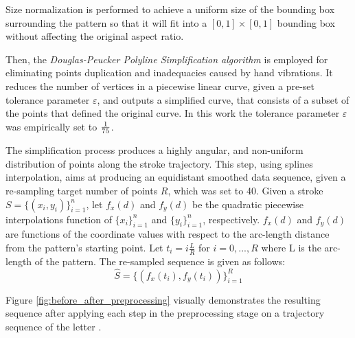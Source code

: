 \documentclass[10pt, conference, compsocconf]{IEEEtran}
\begin{document}
Size normalization is performed to achieve a uniform size of the bounding box surrounding the pattern so that it will fit into a $[0,1]\times[0,1]$ bounding box without affecting the original aspect ratio. 

Then, the \emph{Douglas-Peucker Polyline Simplification algorithm} \cite{douglas1973algorithms} is employed for eliminating points duplication and inadequacies caused by hand vibrations. 
It reduces the number of vertices in a piecewise linear curve, given a pre-set tolerance parameter $\varepsilon$, and outputs a simplified curve, that consists of a subset of the points that defined the original curve.
In this work the tolerance parameter $\varepsilon$ was empirically set to ${1 \over 75}$.

The simplification process produces a highly angular, and non-uniform distribution of points along the stroke trajectory.
This step, using splines interpolation, aims at producing an equidistant smoothed data sequence, given a re-sampling target number of points $R$, which was set to 40. 
Given a stroke $S=\{(x_i,y_i)\}_{i=1}^{n}$, let $f_{x}(d)$ and $f_{y}(d)$ be the quadratic piecewise interpolations function of $\{x_i\}_{i=1}^{n}$ and $\{y_i\}_{i=1}^{n}$, respectively. 
$f_{x}(d)$ and $f_{y}(d)$ are functions of the coordinate values with respect to the arc-length distance from the pattern's starting point. 
Let $t_i=i\frac{L}{R}$ for $i=0,...,R$ where L is the arc-length of the pattern.
The re-sampled sequence is given as follows:
\begin{equation}
\widehat{S}=\{(f_x(t_i),f_y(t_i))\}_{i=1}^{R}
\end{equation}

Figure \ref{fig:before_after_preprocessing} visually demonstrates the resulting sequence after applying each step in the preprocessing stage on a trajectory sequence of the letter . 
\end{document}
